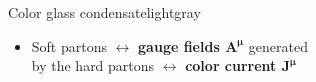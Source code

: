 \documentclass[aspectratio=169,11pt,usenames,dvipsnames]{beamer}
\begin{document}
\begin{frame}
\begin{columns}[onlytextwidth,t]
            \begin{custombox2}{Color glass condensate}{lightgray}
                \small
                \begin{varwidth}{0.92\textwidth}
                \begin{itemize}\itemsep0em 
                    \item 
                    Soft partons $\leftrightarrow$ {\color{palviolet}\bfseries gauge fields $\boldsymbol{A^\mu}$} generated \\ by the hard partons $\leftrightarrow$ {\color{palteal}\bfseries color current $\boldsymbol{J^\mu}$}
                \end{itemize}
                \end{varwidth}
            \end{custombox2}


\end{columns}
\end{frame}
\end{document}
